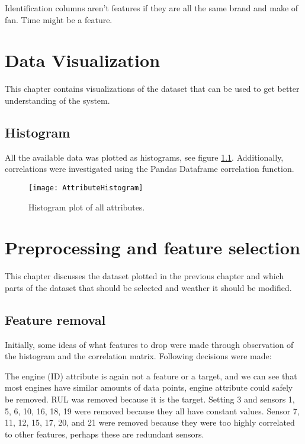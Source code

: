 \documentclass[%
oneside,    %
project,    %
nosummary   %
]{USN-MSc}
\begin{document}
Identification columns aren't features if they are all the same brand and make of fan.
Time might be a feature.

\chapter{Data Visualization}
\label{ch:visualization}
This chapter contains visualizations of the dataset that can be used to get better understanding of the system.

\section{Histogram}
\label{sec:histogram}
All the available data was plotted as histograms, see figure \ref{fig:rawHistogram}. Additionally, correlations were investigated using the Pandas Dataframe correlation function.

\begin{figure}[!ht]
  \centering
  \texttt{[image: AttributeHistogram]}
  \caption{Histogram plot of all attributes.}
  \label{fig:rawHistogram}
\end{figure}

\chapter{Preprocessing and feature selection}
\label{ch:preprocessing}
This chapter discusses the dataset plotted in the previous chapter and which parts of the dataset that should be selected and weather it should be modified.

\section{Feature removal}
\label{sec:featureRemoval}

Initially, some ideas of what features to drop were made through observation of the histogram and the correlation matrix. Following decisions were made:

The engine (ID) attribute is again not a feature or a target, and we can see that most engines have similar amounts of data points, engine attribute could safely be removed.
RUL was removed because it is the target.
Setting 3 and sensors 1, 5, 6, 10, 16, 18, 19 were removed because they all have constant values.
Sensor 7, 11, 12, 15, 17, 20, and 21 were removed because they were too highly correlated to other features, perhaps these are redundant sensors.
\end{document}
